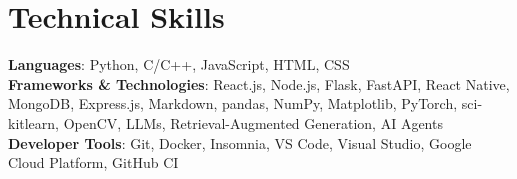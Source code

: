 \documentclass[letterpaper,11pt]{article}
\begin{document}
%
\section{Technical Skills}
 \begin{itemize}[leftmargin=0.15in, label={}]
    \small{\item{
     \textbf{Languages}{: Python, C/C++, JavaScript, HTML, CSS} \\
     \textbf{Frameworks \& Technologies}{: React.js, Node.js, Flask, FastAPI, React Native, MongoDB, Express.js, Markdown, pandas, NumPy, Matplotlib, PyTorch, sci-kitlearn, OpenCV, LLMs, Retrieval-Augmented Generation, AI Agents} \\
     \textbf{Developer Tools}{: Git, Docker, Insomnia, VS Code, Visual Studio, Google Cloud Platform, GitHub CI} \\

    }}
 \end{itemize}


\end{document}

